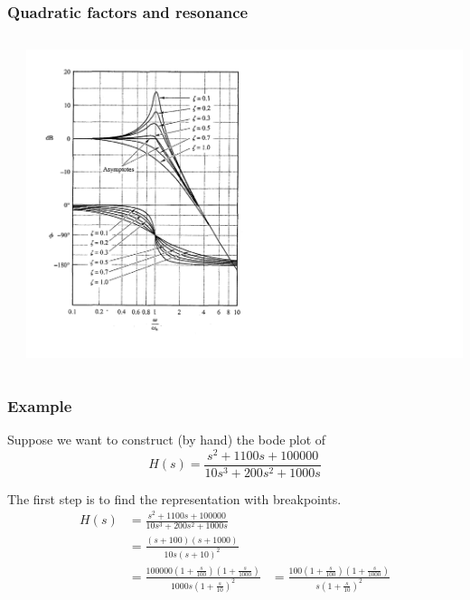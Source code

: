 \begin{frame}
\frametitle{Quadratic factors and resonance}

\begin{columns}
\begin{column}{0.19\textwidth}
\end{column}
\begin{column}{0.81\textwidth}
\includegraphics[scale = 0.35]{Resonance}
\end{column}
\end{columns}


\end{frame}


\begin{frame}
\frametitle{Example}
Suppose we want to construct (by hand) the bode plot of $$H(s) = \frac{s^2 + 1100s + 100000}{10s^3 + 200s^2 + 1000s}$$

The first step is to find the representation with breakpoints.
\begin{align*}
    H(s) &=  \frac{s^2 + 1100s + 100000}{10s^3 + 200s^2 + 1000s}\\
            &= \frac{(s+100)(s+1000)}{10s(s+10)^2}\\
	 &= \frac{100000(1+\frac{s}{100})(1+\frac{s}{1000})}{1000s(1+\frac{s}{10})^2}
	 &= \frac{100(1+\frac{s}{100})(1+\frac{s}{1000})}{s(1+\frac{s}{10})^2}
\end{align*}

\end{frame}


